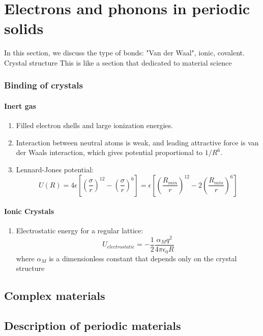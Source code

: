 \documentclass[12pt,a4paper]{article}
\begin{document}
\section{Electrons and phonons in periodic solids}
    In this section, we discuss the type of bonds: "Van der Waal", ionic, covalent. Crystal structure
    This is like a section that dedicated to material science
    \subsubsection{Binding of crystals}
        \paragraph*{Inert gas}
        \begin{enumerate}
            \item Filled electron shells and large ionization energies.
            \item Interaction between neutral atoms is weak, and leading attractive force is van der Waals interaction, which gives potential proportional to $1/R^6$.
            \item Lennard-Jones potential:
            \begin{equation}
                U(R) = 4\epsilon[(\dfrac{\sigma}{r})^{12}-(\dfrac{\sigma}{r})^{6}] = \epsilon[(\dfrac{R_{min}}{r})^{12}-2(\dfrac{R_{min}}{r})^{6}]
            \end{equation}
        \end{enumerate}
        \paragraph*{Ionic Crystals}
            \begin{enumerate}
                \item Electrostatic energy for a regular lattice:
                \begin{equation}
                    U_{electrostatic} = -\frac{1}{2}\frac{\alpha_M q^2}{4\pi \epsilon_0 R}
                \end{equation}
                where $\alpha_M$ is a dimensionless constant that depends only on the crystal structure
            \end{enumerate}
    \subsection{Complex materials}
    \subsection{Description of periodic materials}
\end{document}
